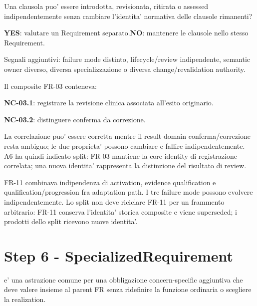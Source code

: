 \documentclass[11pt,a4paper]{article}
\begin{document}
\begin{ddtacheck}
Una clausola puo' essere introdotta, revisionata, ritirata o assessed indipendentemente senza cambiare l'identita' normativa delle clausole rimanenti?\par
\textbf{YES}: valutare un Requirement separato.\quad \textbf{NO}: mantenere le clausole nello stesso Requirement.
\end{ddtacheck}

Segnali aggiuntivi: failure mode distinto, lifecycle/review indipendente, semantic owner diverso, diversa specializzazione o diversa change/revalidation authority.

\begin{ddtaexample}[title={DermaTriage A6 - FR-03 split}]
Il composite FR-03 conteneva:\par
\textbf{NC-03.1}: registrare la revisione clinica associata all'esito originario.\par
\textbf{NC-03.2}: distinguere conferma da correzione.\par
La correlazione puo' essere corretta mentre il result domain conferma/correzione resta ambiguo; le due proprieta' possono cambiare e fallire indipendentemente. A6 ha quindi indicato split: FR-03 mantiene la core identity di registrazione correlata; una nuova identita' rappresenta la distinzione del risultato di review.
\end{ddtaexample}

\begin{ddtaexample}[title={DermaTriage A6 - FR-11 e identity preservation}]
FR-11 combinava indipendenza di activation, evidence qualification e qualification/progression fra adaptation path. I tre failure mode possono evolvere indipendentemente. Lo split non deve riciclare FR-11 per un frammento arbitrario: FR-11 conserva l'identita' storica composite e viene superseded; i prodotti dello split ricevono nuove identita'.
\end{ddtaexample}

\section{Step 6 - SpecializedRequirement}
\closedtag

\SR{} e' una astrazione comune per una obbligazione concern-specific aggiuntiva che deve valere insieme al parent FR senza ridefinire la funzione ordinaria o scegliere la realization.
\end{document}
